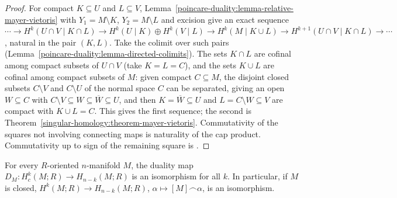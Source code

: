 \begin{proof}
For compact $K \subseteq U$ and $L \subseteq V$, Lemma~\ref{poincare-duality:lemma-relative-mayer-vietoris} with $Y_1 = M \setminus K$, $Y_2 = M \setminus L$ and excision give an exact
sequence $\cdots \to H^k(U \cap V \mid K \cap L) \to H^k(U \mid K) \oplus H^k(V \mid L) \to H^k(M \mid K \cup L) \to H^{k+1}(U \cap V \mid K \cap L) \to \cdots$, natural in the pair
$(K, L)$. Take the colimit over such pairs (Lemma~\ref{poincare-duality:lemma-directed-colimits}). The sets $K \cap L$ are cofinal among compact subsets of $U \cap V$ (take
$K = L = C$), and the sets $K \cup L$ are cofinal among compact subsets of $M$: given compact $C \subseteq M$, the disjoint closed subsets $C \setminus V$ and $C \setminus U$ of
the normal space $C$ can be separated, giving an open $W \subseteq C$ with $C \setminus V \subseteq W \subseteq \overline{W} \subseteq U$, and then $K = \overline{W} \subseteq U$
and $L = C \setminus W \subseteq V$ are compact with $K \cup L = C$. This gives the first sequence; the second is Theorem~\ref{singular-homology:theorem-mayer-vietoris}.
Commutativity of the squares not involving connecting maps is naturality of the cap product. Commutativity up to sign of the remaining square is
\cite[Lemma 3.36]{hatcher-at}.
\end{proof}

\begin{theorem}\label{poincare-duality:theorem-poincare-duality}
For every $R$-oriented $n$-manifold $M$, the duality map $D_M \colon H^k_c(M; R) \to H_{n-k}(M; R)$ is an isomorphism for all $k$. In particular, if $M$ is closed,
$H^k(M; R) \to H_{n-k}(M; R)$, $\alpha \mapsto [M] \frown \alpha$, is an isomorphism.
\end{theorem}

